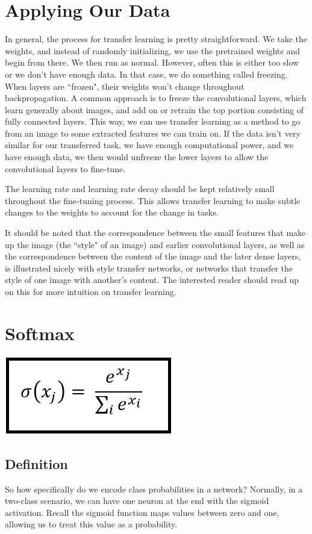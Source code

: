\documentclass{article}
\begin{document}
\section{Applying Our Data}
In general, the process for transfer learning is pretty straightforward. We take the weights, and instead of randomly initializing, we use the pretrained weights and begin from there. We then run as normal. However, often this is either too slow or we don't have enough data. In that case, we do something called freezing. When layers are ``frozen", their weights won't change throughout backpropagation. A common approach is to freeze the convolutional layers, which learn generally about images, and add on or retrain the top portion consisting of fully connected layers. This way, we can use transfer learning as a method to go from an image to some extracted features we can train on. If the data isn't very similar for our transferred task, we have enough computational power, and we have enough data, we then would unfreeze the lower layers to allow the convolutional layers to fine-tune.

The learning rate and learning rate decay should be kept relatively small throughout the fine-tuning process. This allows transfer learning to make subtle changes to the weights to account for the change in tasks.

It should be noted that the correspondence between the small features that make up the image (the ``style" of an image) and earlier convolutional layers, as well as the correspondence between the content of the image and the later dense layers, is illustrated nicely with style transfer networks, or networks that transfer the style of one image with another's content. The interested reader should read up on this for more intuition on transfer learning.

\section{Softmax}
\begin{center}
\includegraphics[scale=0.5]{softmax}
\end{center}
\subsection{Definition}
So how specifically do we encode class probabilities in a network? Normally, in a two-class scenario, we can have one neuron at the end with the sigmoid activation. Recall the sigmoid function maps values between zero and one, allowing us to treat this value as a probability.
\end{document}
